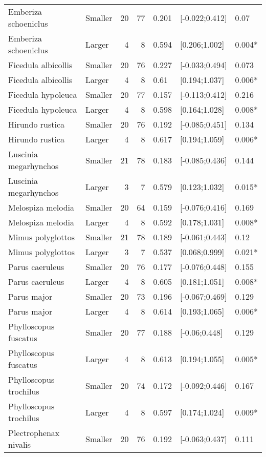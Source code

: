 \documentclass{article}
\begin{document}
\begin{table}[H]
\begin{tabular}{llrrlll}
  Emberiza schoeniclus & Smaller & 20 & 77 & 0.201 & [-0.022;0.412] & 0.07 \\ 
  Emberiza schoeniclus & Larger & 4 & 8 & 0.594 & [0.206;1.002] & 0.004* \\ 
  Ficedula albicollis & Smaller & 20 & 76 & 0.227 & [-0.033;0.494] & 0.073 \\ 
  Ficedula albicollis & Larger & 4 & 8 & 0.61 & [0.194;1.037] & 0.006* \\ 
  Ficedula hypoleuca & Smaller & 20 & 77 & 0.157 & [-0.113;0.412] & 0.216 \\ 
  Ficedula hypoleuca & Larger & 4 & 8 & 0.598 & [0.164;1.028] & 0.008* \\ 
  Hirundo rustica & Smaller & 20 & 76 & 0.192 & [-0.085;0.451] & 0.134 \\ 
  Hirundo rustica & Larger & 4 & 8 & 0.617 & [0.194;1.059] & 0.006* \\ 
  Luscinia megarhynchos & Smaller & 21 & 78 & 0.183 & [-0.085;0.436] & 0.144 \\ 
  Luscinia megarhynchos & Larger & 3 & 7 & 0.579 & [0.123;1.032] & 0.015* \\ 
  Melospiza melodia & Smaller & 20 & 64 & 0.159 & [-0.076;0.416] & 0.169 \\ 
  Melospiza melodia & Larger & 4 & 8 & 0.592 & [0.178;1.031] & 0.008* \\ 
  Mimus polyglottos & Smaller & 21 & 78 & 0.189 & [-0.061;0.443] & 0.12 \\ 
  Mimus polyglottos & Larger & 3 & 7 & 0.537 & [0.068;0.999] & 0.021* \\ 
  Parus caeruleus & Smaller & 20 & 76 & 0.177 & [-0.076;0.448] & 0.155 \\ 
  Parus caeruleus & Larger & 4 & 8 & 0.605 & [0.181;1.051] & 0.008* \\ 
  Parus major & Smaller & 20 & 73 & 0.196 & [-0.067;0.469] & 0.129 \\ 
  Parus major & Larger & 4 & 8 & 0.614 & [0.193;1.065] & 0.006* \\ 
  Phylloscopus fuscatus & Smaller & 20 & 77 & 0.188 & [-0.06;0.448] & 0.129 \\ 
  Phylloscopus fuscatus & Larger & 4 & 8 & 0.613 & [0.194;1.055] & 0.005* \\ 
  Phylloscopus trochilus & Smaller & 20 & 74 & 0.172 & [-0.092;0.446] & 0.167 \\ 
  Phylloscopus trochilus & Larger & 4 & 8 & 0.597 & [0.174;1.024] & 0.009* \\ 
  Plectrophenax nivalis & Smaller & 20 & 76 & 0.192 & [-0.063;0.437] & 0.111 \\ 

\end{tabular}
\end{table}
\end{document}
